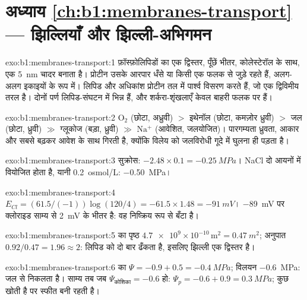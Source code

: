 \section*{अध्याय \ref{ch:b1:membranes-transport} --- झिल्लियाँ और झिल्ली-अभिगमन}

\begin{solution}{exo:b1:membranes-transport:1}
फ़ॉस्फ़ोलिपिडों का एक द्विस्तर, पूँछें भीतर, कोलेस्टेरॉल के साथ, एक
\qty{5}{nm} चादर बनाता है। प्रोटीन उसके आरपार धँसे या किसी एक फलक से जुड़े
रहते हैं, अलग-अलग इकाइयों के रूप में। लिपिड और अधिकांश प्रोटीन तल में
पार्श्व विसरण करते हैं, जो एक द्विविमीय तरल है। दोनों पर्ण लिपिड-संघटन में
भिन्न हैं, और शर्करा-शृंखलाएँ केवल बाहरी फलक पर हैं।
\end{solution}

\begin{solution}{exo:b1:membranes-transport:2}
$\mathrm{O_2}$ (छोटा, अध्रुवी) $>$ इथेनॉल (छोटा, कमज़ोर ध्रुवी)
$>$ जल (छोटा, ध्रुवी) $\gg$ ग्लूकोज (बड़ा, ध्रुवी) $\gg$
$\mathrm{Na^+}$ (आवेशित, जलयोजित)। पारगम्यता ध्रुवता,
आकार और सबसे बढ़कर आवेश के साथ गिरती है, क्योंकि विलेय को
जलविरोधी गूदे में घुलना ही पड़ता है।
\end{solution}

\begin{solution}{exo:b1:membranes-transport:3}
सुक्रोस: $-2.48\times 0.1 = \qty{-0.25}{MPa}$। NaCl दो आयनों में
वियोजित होता है, यानी \qty{0.2}{osmol/L}: \qty{-0.50}{MPa}।
\end{solution}

\begin{solution}{exo:b1:membranes-transport:4}
$E_{Cl} = (61.5/(-1))\log(120/4) = -61.5\times 1.48 = \qty{-91}{mV}$।
\qty{-89}{mV} पर क्लोराइड साम्य से \qty{2}{mV} के भीतर है: वह
निष्क्रिय रूप से बँटा है।
\end{solution}

\begin{solution}{exo:b1:membranes-transport:5}
 का पृष्ठ $\num{4.7e9}\times 10^{-10}\,\mathrm{m^2} =
\qty{0.47}{m^2}$; अनुपात $0.92/0.47 = 1.96 \approx 2$: लिपिड  को
दो बार ढँकता है, इसलिए झिल्ली एक द्विस्तर है।
\end{solution}

\begin{solution}{exo:b1:membranes-transport:6}
 का $\Psi = -0.9 + 0.5 = \qty{-0.4}{MPa}$; विलयन \qty{-0.6}{MPa}:
जल  से निकलता है। साम्य तब जब $\Psi_{\text{कोशिका}} = -0.6$ हो:
$\Psi_p = -0.6 + 0.9 = \qty{0.3}{MPa}$;  कुछ  खोती है पर
स्फीत बनी रहती है।
\end{solution}

